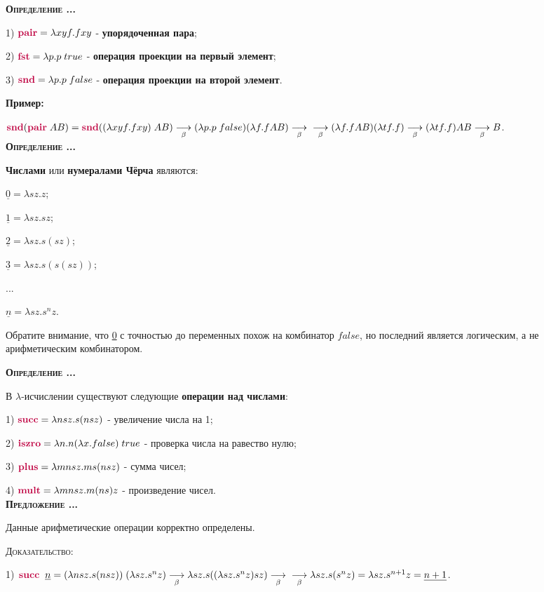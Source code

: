 \documentclass[18pt, a4paper]{extarticle}
\newcounter{par}
\newcounter{spar}
\newcounter{zap}
\newcommand{\opr}{\textbf{\textsc{Определение \thepar.\if\thespar1\thespar.\fi\thezap.\;}}\stepcounter{zap}}
\newcommand{\predl}{\textbf{\textsc{Предложение \thepar.\if\thespar1\thespar.\fi\thezap.\;}}\stepcounter{zap}}
\newcommand{\primer}{\textbf{Пример:\;}}
\newcommand{\dok}{\textsc{Доказательство:}}
\newcommand{\lm}{\lambda}
\newcommand{\redb}{\underset{\beta}{\longrightarrow}}
\newcommand{\lfunction}[1]{\textcolor{purple}{\textbf{#1}}}
\newcommand{\churchnum}[1]{{\underline{#1}}}
\begin{document}
\opr

1) $\lfunction{pair}=\lm xyf.fxy$ - \textbf{упорядоченная пара};

2) $\lfunction{fst}=\lm p.p\;true$ - \textbf{операция проекции на первый элемент};

3) $\lfunction{snd}=\lm p.p\;false$ - \textbf{операция проекции на второй элемент}.\\

\newpage

\primer

$\lfunction{snd}(\lfunction{pair}\;AB) = \lfunction{snd}((\lm xyf.fxy)\;AB) \redb (\lm p.p\;false)(\lm f.fAB)\redb\newline\redb (\lm f.fAB)(\lm tf.f)\redb (\lm tf.f)AB\redb B$.\\

\opr

\textbf{Числами} или \textbf{нумералами Чёрча} являются:

$\churchnum{0}=\lm sz.z$;

$\churchnum{1}=\lm sz.sz$;

$\churchnum{2}=\lm sz.s(sz)$;

$\churchnum{3}=\lm sz.s(s(sz))$;

...

$\churchnum{n}=\lm sz.s^nz$.

Обратите внимание, что \churchnum{0} с точностью до переменных похож на комбинатор $false$, но последний является логическим, а не арифметическим комбинатором.

\opr

В $\lm$-исчислении существуют следующие \textbf{операции над числами}:

1) $\lfunction{succ}=\lm nsz.s(nsz)$ - увеличение числа на 1;

2) $\lfunction{iszro}=\lm n.n(\lm x.false)\;true$ - проверка числа на равество нулю;

3) $\lfunction{plus}=\lm mnsz.ms(nsz)$ - сумма чисел;

4) $\lfunction{mult}=\lm mnsz.m(ns)z$ - произведение чисел.\\

\predl

Данные арифметические операции корректно определены.

\dok

1) $\lfunction{succ}\;\;\churchnum{n}=(\lm nsz.s(nsz))\;(\lm sz.s^nz)\redb\lm sz.s((\lm sz.s^nz)sz)\redb\newline\redb\lm sz.s(s^nz)=\lm sz.s^{n + 1}z=\churchnum{n + 1}$.
\end{document}
